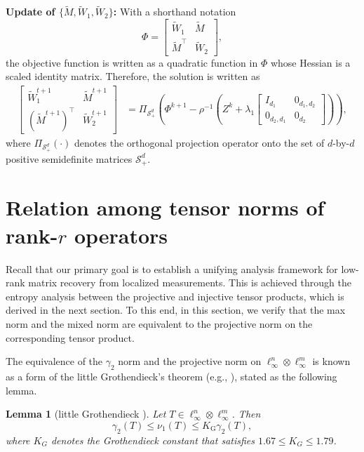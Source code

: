 \documentclass[11pt]{article}
\newtheorem{lemma}{Lemma}[section]
\begin{document}
\noindent\noindent\textbf{Update of $\{\widetilde{M}, \widetilde{W}_1, \widetilde{W}_2\}$:} 
With a shorthand notation 
\[
\Phi = \begin{bmatrix} \tilde{W}_1 & \tilde{M} \\ \tilde{M}^\top & \tilde{W}_2 \end{bmatrix},
\]
the objective function is written as a quadratic function in $\Phi$ whose Hessian is a scaled identity matrix. Therefore, the solution is written as 
\begin{align*}
\begin{bmatrix} \widetilde{W}_1^{t+1} & \widetilde{M}^{t+1} \\ (\widetilde{M}^{t+1})^\top & \widetilde{W}_2^{t+1} \end{bmatrix}
& = \Pi_{\mathcal{S}_+^d}\left(\Phi^{k+1} - \rho^{-1} \left( Z^{k} + \lambda_1 \begin{bmatrix}
I_{d_1} & 0_{d_1,d_2} \\ 
0_{d_2,d_1} & 0_{d_2} \end{bmatrix} \right )\right),
\end{align*} 
where $\Pi_{\mathcal{S}_+^d}(\cdot)$ denotes the orthogonal projection operator onto the set of $d$-by-$d$ positive semidefinite matrices $\mathcal{S}_+^d$. 


\section{Relation among tensor norms of rank-$r$ operators}
\label{sec:rankineq}

Recall that our primary goal is to establish a unifying analysis framework for low-rank matrix recovery from localized measurements. 
This is achieved through 
the entropy analysis between the projective and injective tensor products, which is derived in the next section. 
To this end, in this section, we verify that the max norm and the mixed norm are equivalent to the projective norm on the corresponding tensor product. 

The equivalence of the $\gamma_2$ norm and the projective norm on $\ell_\infty^n \otimes \ell_\infty^m$ is known as a form of the little Grothendieck's theorem (e.g., \citep[Theorem~3.1]{pisier2012grothendieck}), stated as the following lemma. 
\begin{lemma}[{little Grothendieck \citep[Theorem~3.1]{pisier2012grothendieck}}]
\label{lemma:nu1gamma2}
Let $T \in \ell_\infty^n \otimes \ell_\infty^m$. Then
\begin{equation}
\label{eq:littleGT}
\gamma_2(T) \leq \nu_1(T) \leq K_\mathrm{G} \gamma_2(T),
\end{equation}
where $K_G$ denotes the Grothendieck constant that satisfies $1.67 \leq K_G \leq 1.79$.
\end{lemma}
\end{document}
